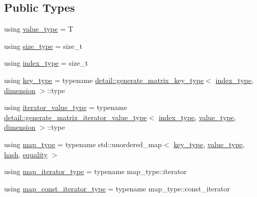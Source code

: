 \subsection*{Public Types}
\begin{DoxyCompactItemize}
\item 
using \hyperlink{structmatrix_1_1matrix_ab940e7a84942339cdee7c0f0d3bd8ef9}{value\+\_\+type} = T
\item 
using \hyperlink{structmatrix_1_1matrix_aebc6efd587a1c3f0a951631d6ee6837f}{size\+\_\+type} = size\+\_\+t
\item 
using \hyperlink{structmatrix_1_1matrix_a87b61e7f35dcd5991cd3f243cfeced06}{index\+\_\+type} = size\+\_\+t
\item 
using \hyperlink{structmatrix_1_1matrix_af7b5498ac1b615cb9ef51bd185a2557e}{key\+\_\+type} = typename \hyperlink{classmatrix_1_1detail_1_1generate__matrix__key__type}{detail\+::generate\+\_\+matrix\+\_\+key\+\_\+type}$<$ \hyperlink{structmatrix_1_1matrix_a87b61e7f35dcd5991cd3f243cfeced06}{index\+\_\+type}, \hyperlink{structmatrix_1_1matrix_a7d76bd51fd998974f59ea4035e053f74}{dimension} $>$\+::type
\item 
using \hyperlink{structmatrix_1_1matrix_a1de5c69f5d9e3b6d3e54b1e4cb433d65}{iterator\+\_\+value\+\_\+type} = typename \hyperlink{classmatrix_1_1detail_1_1generate__matrix__iterator__value__type}{detail\+::generate\+\_\+matrix\+\_\+iterator\+\_\+value\+\_\+type}$<$ \hyperlink{structmatrix_1_1matrix_a87b61e7f35dcd5991cd3f243cfeced06}{index\+\_\+type}, \hyperlink{structmatrix_1_1matrix_ab940e7a84942339cdee7c0f0d3bd8ef9}{value\+\_\+type}, \hyperlink{structmatrix_1_1matrix_a7d76bd51fd998974f59ea4035e053f74}{dimension} $>$\+::type
\item 
using \hyperlink{structmatrix_1_1matrix_a435a771dfb8b36e4cbc5ec09cf391796}{map\+\_\+type} = typename std\+::unordered\+\_\+map$<$ \hyperlink{structmatrix_1_1matrix_af7b5498ac1b615cb9ef51bd185a2557e}{key\+\_\+type}, \hyperlink{structmatrix_1_1matrix_ab940e7a84942339cdee7c0f0d3bd8ef9}{value\+\_\+type}, \hyperlink{structmatrix_1_1matrix_1_1hash}{hash}, \hyperlink{structmatrix_1_1matrix_1_1equality}{equality} $>$
\item 
using \hyperlink{structmatrix_1_1matrix_a718c745a811e13b64ba21239288666a6}{map\+\_\+iterator\+\_\+type} = typename map\+\_\+type\+::iterator
\item 
using \hyperlink{structmatrix_1_1matrix_a8d4e1501743e5c63f4dff2e0ae27cf89}{map\+\_\+const\+\_\+iterator\+\_\+type} = typename map\+\_\+type\+::const\+\_\+iterator
\item 

\end{DoxyCompactItemize}
